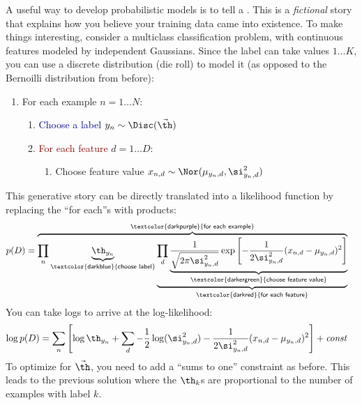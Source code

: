 A useful way to develop probabilistic models is to tell a
.  This is a \emph{fictional} story that
explains how you believe your training data came into existence.  To
make things interesting, consider a multiclass classification problem,
with continuous features modeled by independent Gaussians.  Since the
label can take values $1 \dots K$, you can use a discrete
distribution (die roll) to model it (as opposed to the Bernoilli
distribution from before):
%
\begin{enumerate}
  \item \textcolor{darkpurple}{For each example} $n = 1 \dots N$:
    \begin{enumerate}
      \item \textcolor{darkblue}{Choose a label} $y_n \sim \Disc(\vec\th)$
      \item \textcolor{darkred}{For each feature} $d = 1 \dots D$:
        \begin{enumerate}
          \item \textcolor{darkergreen}{Choose feature value} $x_{n,d} \sim \Nor(\mu_{y_n,d}, \si^2_{y_n,d})$
         \end{enumerate}
     \end{enumerate}
\end{enumerate}
%
This generative story can be directly translated into a likelihood
function by replacing the ``for each''s with products:
%
\begin{align}
  p(D)
  &=  \overbrace{
      \prod_n
       \underbrace{\th_{y_n}}_{\textsf{\textcolor{darkblue}{choose label}}}
       \underbrace{
       \prod_d
         \underbrace{\frac 1 {\sqrt{2 \pi \si_{y_n,d}^2}}
         \exp\left[
           -\frac 1 {2 \si_{y_n,d}^2} (x_{n,d} - \mu_{y_n,d})^2
           \right]}_{\textsf{\textcolor{darkergreen}{choose feature value}}}
         }_{\textsf{\textcolor{darkred}{for each feature}}}}
       ^{\textsf{\textcolor{darkpurple}{for each example}}}
\end{align}
%
You can take logs to arrive at the log-likelihood:
%
\begin{align}
\log p(D)
&=
\sum_n
  \left[
    \log \th_{y_n} +
    \sum_d
      -\frac 1 2 \log(\si_{y_n,d}^2)
      -\frac 1 {2 \si_{y_n,d}^2} (x_{n,d} - \mu_{y_n,d})^2
      \right]
  + \textit{const}
\end{align}
%
To optimize for $\vec\th$, you need to add a ``sums to one''
constraint as before.  This leads to the previous solution where the
$\th_k$s are proportional to the number of examples with label $k$.
